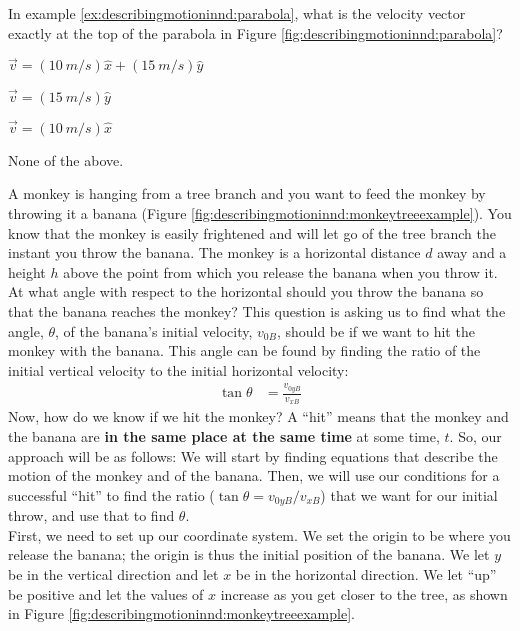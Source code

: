\begin{checkpoint}{\begin{MCquestion}{In example \ref{ex:describingmotioninnd:parabola}, what is the velocity vector exactly at the top of the parabola in Figure \ref{fig:describingmotioninnd:parabola}?}
\item $\vec v=(\SI{10}{m/s})\hat x+(\SI{15}{m/s})\hat y$
\item $\vec v=(\SI{15}{m/s})\hat y$
\item $\vec v=(\SI{10}{m/s})\hat x$ %
\item None of the above.
\end{MCquestion}}
\end{checkpoint}
\newpage
\begin{example}{
A monkey is hanging from a tree branch and you want to feed the monkey by throwing it a banana (Figure \ref{fig:describingmotioninnd:monkeytreeexample}). You know that the monkey is easily frightened and will let go of the tree branch the instant you throw the banana. The monkey is a horizontal distance $d$ away and a height $h$ above the point from which you release the banana when you throw it. At what angle with respect to the horizontal should you throw the banana so that the banana reaches the monkey?
}
This question is asking us to find what the angle, $\theta$, of the banana's initial velocity, $v_{0B}$, should be if we want to hit the monkey with the banana. This angle can be found by finding the ratio of the initial vertical velocity to the initial horizontal velocity:
\begin{align*}
\tan\theta&=\frac{v_{0yB}}{v_{xB}}
\end{align*}
Now, how do we know if we hit the monkey? A ``hit'' means that the monkey and the banana are \textbf{in the same place at the same time} at some time, $t$. So, our approach will be as follows: We will start by finding equations that describe the motion of the monkey and of the banana. Then, we will use our conditions for a successful ``hit'' to find the ratio ($\tan\theta=v_{0yB}/v_{xB}$) that we want for our initial throw, and use that to find $\theta$.\\

First, we need to set up our coordinate system. We set the origin to be where you release the banana; the origin is thus the initial position of the banana. We let $y$ be in the vertical direction and let $x$ be in the horizontal direction. We let ``up'' be positive and let the values of $x$ increase as you get closer to the tree, as shown in Figure \ref{fig:describingmotioninnd:monkeytreeexample}. 


\end{example}
